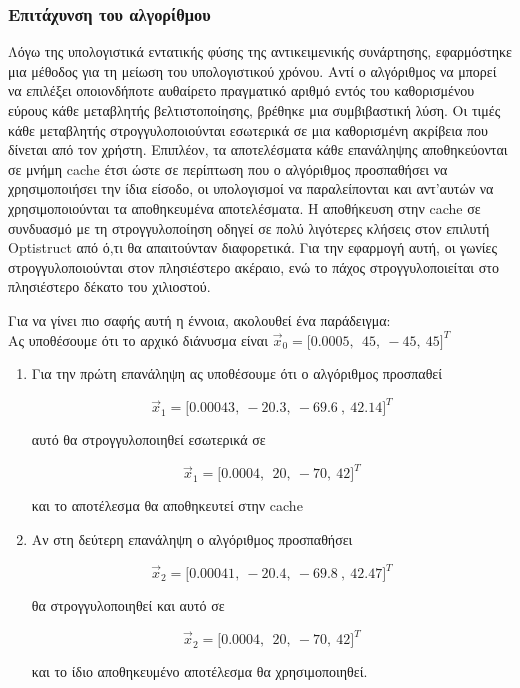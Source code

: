 \subsubsection{Επιτάχυνση του αλγορίθμου}

Λόγω της υπολογιστικά εντατικής φύσης της αντικειμενικής συνάρτησης, εφαρμόστηκε μια μέθοδος για τη μείωση του υπολογιστικού χρόνου. Αντί ο αλγόριθμος να μπορεί να επιλέξει οποιονδήποτε αυθαίρετο πραγματικό αριθμό εντός του καθορισμένου εύρους κάθε μεταβλητής βελτιστοποίησης, βρέθηκε μια συμβιβαστική λύση. Οι τιμές κάθε μεταβλητής στρογγυλοποιούνται εσωτερικά σε μια καθορισμένη ακρίβεια που δίνεται από τον χρήστη. Επιπλέον, τα αποτελέσματα κάθε επανάληψης αποθηκεύονται σε μνήμη \textlatin{cache} έτσι ώστε σε περίπτωση που ο αλγόριθμος προσπαθήσει να χρησιμοποιήσει την ίδια είσοδο, οι υπολογισμοί να παραλείπονται και αντ'αυτών να χρησιμοποιούνται τα αποθηκευμένα αποτελέσματα. Η αποθήκευση στην \textlatin{cache} σε συνδυασμό με τη στρογγυλοποίηση οδηγεί σε πολύ λιγότερες κλήσεις στον επιλυτή \textlatin{Optistruct} από ό,τι θα απαιτούνταν διαφορετικά. Για την εφαρμογή αυτή, οι γωνίες στρογγυλοποιούνται στον πλησιέστερο ακέραιο, ενώ το πάχος στρογγυλοποιείται στο πλησιέστερο δέκατο του χιλιοστού.

Για να γίνει πιο σαφής αυτή η έννοια, ακολουθεί ένα παράδειγμα: \\


Ας υποθέσουμε ότι το αρχικό διάνυσμα είναι
\({\vec{x}}_{0} = \lbrack 0.0005,\ \ 45,\  - 45,\ 45\rbrack^{T}\)

\begin{enumerate}
\def\labelenumi{\arabic{enumi}.}
\item
  Για την πρώτη επανάληψη ας υποθέσουμε ότι ο αλγόριθμος προσπαθεί

\[{\vec{x}}_{1} = \lbrack 0.00043,\  - 20.3,\  - 69.6\ ,\ 42.14\rbrack^{T}\]

αυτό θα στρογγυλοποιηθεί εσωτερικά σε

\[{\vec{x}}_{1} = \lbrack 0.0004,\ \ 20,\  - 70,\ 42\rbrack^{T}\]

και το αποτέλεσμα θα αποθηκευτεί στην \textlatin{cache}

\item
  Αν στη δεύτερη επανάληψη ο αλγόριθμος προσπαθήσει

\[{\vec{x}}_{2} = \lbrack 0.00041,\  - 20.4,\  - 69.8\ ,\ 42.47\rbrack^{T}\]

θα στρογγυλοποιηθεί και αυτό σε

\[{\vec{x}}_{2} = \lbrack 0.0004,\ \ 20,\  - 70,\ 42\rbrack^{T}\]

και το ίδιο αποθηκευμένο αποτέλεσμα θα χρησιμοποιηθεί.
\end{enumerate}


